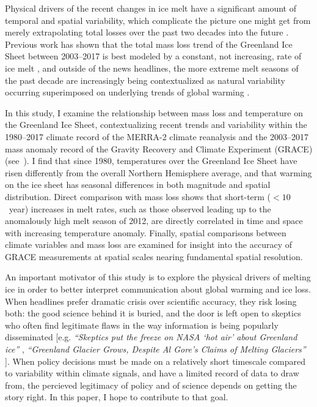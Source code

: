 \documentclass[11pt]{report}
\begin{document}
Physical drivers of the recent changes in ice melt have a significant amount of temporal and spatial variability, which complicate the picture one might get from merely extrapolating total losses over the past two decades into the future \cite[][]{enderlin2014,mcmillan2016,mattingly2018,hahn2018,bevis2019}. Previous work has shown that the total mass loss trend of the Greenland Ice Sheet between 2003--2017 is best modeled by a constant, not increasing, rate of ice melt \cite[][]{getraerFall}, and outside of the news headlines, the more extreme melt seasons of the past decade are increasingly being contextualized as natural variability occurring superimposed on underlying trends of global warming \cite[][]{mattingly2018,hahn2018,bevis2019}. 

In this study, I examine the relationship between mass loss and temperature on the Greenland Ice Sheet, contextualizing recent trends and variability within the 1980--2017 climate record of the MERRA-2 climate reanalysis and the 2003--2017 mass anomaly record of the Gravity Recovery and Climate Experiment (GRACE) (see~). I find that since 1980, temperatures over the Greenland Ice Sheet have risen differently from the overall Northern Hemisphere average, and that warming on the ice sheet has seasonal differences in both magnitude and spatial distribution. Direct comparison with mass loss shows that short-term ($<10$~year) increases in melt rates, such as those observed leading up to the anomalously high melt season of 2012, are directly correlated in time and space with increasing temperature anomaly. Finally, spatial comparisons between climate variables and mass loss are examined for insight into the accuracy of GRACE measurements at spatial scales nearing fundamental spatial resolution.

An important motivator of this study is to explore the physical drivers of melting ice in order to better interpret communication about global warming and ice loss. When headlines prefer dramatic crisis over scientific accuracy, they risk losing both: the good science behind it is buried, and the door is left open to skeptics who often find legitimate flaws in the way information is being popularly disseminated [e.g. \textit{``Skeptics put the freeze on NASA `hot air' about Greenland ice''} \cite[][]{fox}, \textit{``Greenland Glacier Grows, Despite Al Gore's Claims of Melting Glaciers''} \cite[][]{mrc}]. When policy decisions must be made on a relatively short timescale compared to variability within climate signals, and have a limited record of data to draw from, the percieved legitimacy of policy and of science depends on getting the story right. In this paper, I hope to contribute to that goal.
\end{document}
